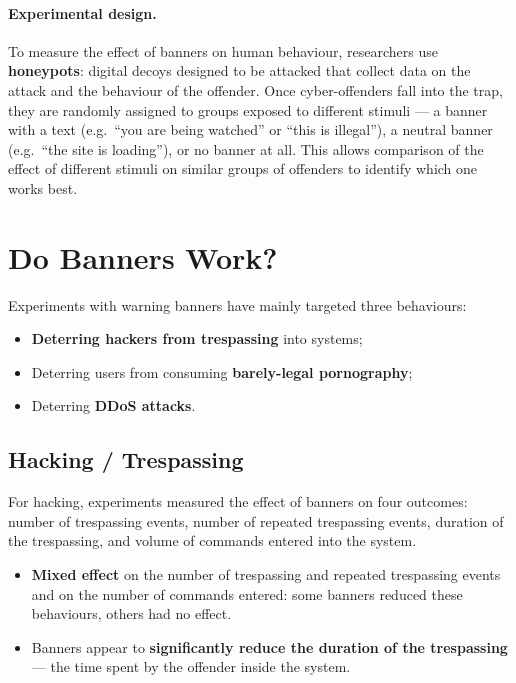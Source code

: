 \documentclass[11pt,a4paper,openany]{report}
\theoremstyle{definition}
\theoremstyle{plain}
\theoremstyle{remark}
\begin{document}
\paragraph{Experimental design.} To measure the effect of banners on human behaviour, researchers use \textbf{honeypots}: digital decoys designed to be attacked that collect data on the attack and the behaviour of the offender. Once cyber-offenders fall into the trap, they are randomly assigned to groups exposed to different stimuli --- a banner with a text (e.g.\ ``you are being watched'' or ``this is illegal''), a neutral banner (e.g.\ ``the site is loading''), or no banner at all. This allows comparison of the effect of different stimuli on similar groups of offenders to identify which one works best.

\section{Do Banners Work?}

Experiments with warning banners have mainly targeted three behaviours:
\begin{itemize}
    \item \textbf{Deterring hackers from trespassing} into systems;
    \item Deterring users from consuming \textbf{barely-legal pornography};
    \item Deterring \textbf{DDoS attacks}.
\end{itemize}

\subsection{Hacking / Trespassing}

For hacking, experiments measured the effect of banners on four outcomes: number of trespassing events, number of repeated trespassing events, duration of the trespassing, and volume of commands entered into the system.

\begin{itemize}
    \item \textbf{Mixed effect} on the number of trespassing and repeated trespassing events and on the number of commands entered: some banners reduced these behaviours, others had no effect.
    \item Banners appear to \textbf{significantly reduce the duration of the trespassing} --- the time spent by the offender inside the system.
\end{itemize}
\end{document}
